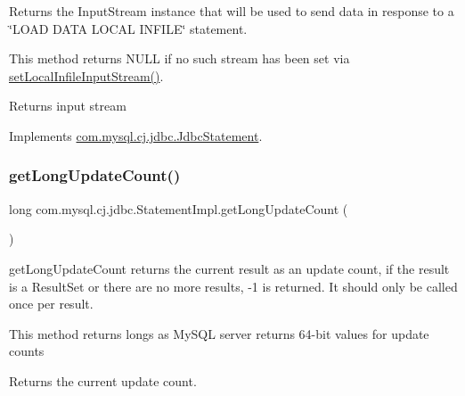 Returns the Input\+Stream instance that will be used to send data in response to a \char`\"{}\+L\+O\+A\+D D\+A\+T\+A L\+O\+C\+A\+L I\+N\+F\+I\+L\+E\char`\"{} statement.

This method returns N\+U\+LL if no such stream has been set via \mbox{\hyperlink{classcom_1_1mysql_1_1cj_1_1jdbc_1_1_statement_impl_a398ed93fc7171fac680cd867a87cbf23}{set\+Local\+Infile\+Input\+Stream()}}.

\begin{DoxyReturn}{Returns}
input stream 
\end{DoxyReturn}


Implements \mbox{\hyperlink{interfacecom_1_1mysql_1_1cj_1_1jdbc_1_1_jdbc_statement_a1f5ddb4f3f7ad5c677a27d5350568eac}{com.\+mysql.\+cj.\+jdbc.\+Jdbc\+Statement}}.

\mbox{\label{classcom_1_1mysql_1_1cj_1_1jdbc_1_1_statement_impl_a05b7122d9eb36876362b1e526e9dfd38}} 
\subsubsection{\texorpdfstring{get\+Long\+Update\+Count()}{getLongUpdateCount()}}
{\footnotesize\ttfamily long com.\+mysql.\+cj.\+jdbc.\+Statement\+Impl.\+get\+Long\+Update\+Count (\begin{DoxyParamCaption}{ }\end{DoxyParamCaption})}

get\+Long\+Update\+Count returns the current result as an update count, if the result is a Result\+Set or there are no more results, -\/1 is returned. It should only be called once per result.

This method returns longs as My\+S\+QL server returns 64-\/bit values for update counts 

\begin{DoxyReturn}{Returns}
the current update count. 
\end{DoxyReturn}
\mbox{\label{classcom_1_1mysql_1_1cj_1_1jdbc_1_1_statement_impl_a1dbdd8b00e13cbaadf54920e8d93075d}} 
